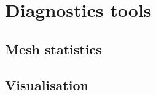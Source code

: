 \section{Diagnostics tools}
\label{section-diagnostics}


\subsection{Mesh statistics}
\label{section-diagnostics-statistics}


\subsection{Visualisation}
\label{section-diagnostics-visualisation}